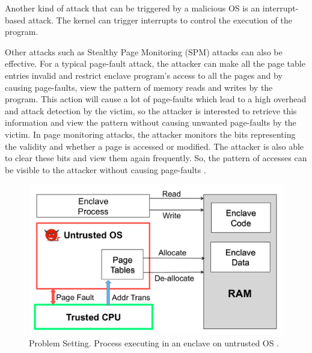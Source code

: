 Another kind of attack that can be triggered by a malicious OS is an interrupt-based attack. The kernel can trigger interrupts to control the execution of the program.

Other attacks such as Stealthy Page Monitoring (SPM) attacks \cite{stealthy,leakycauldron} can also be effective. For a typical page-fault attack, the attacker can make all the page table entries invalid and restrict enclave program’s access to all the pages and by causing page-faults, view the pattern of memory reads and writes by the program. This action will cause a lot of page-faults which lead to a high overhead and attack detection by the victim, so the attacker is interested to retrieve this information and view the pattern without causing unwanted page-faults by the victim. In page monitoring attacks, the attacker monitors the bits representing the validity and whether a page is accessed or modified. The attacker is also able to clear these bits and view them again frequently. So, the pattern of accesses can be visible to the attacker without causing page-faults \cite{stealthy,leakycauldron}.


\begin{figure}
	\includegraphics[scale=0.2]{images/uos1}
	\caption{Problem Setting. Process executing in an enclave on untrusted OS \cite{pigeonhole}.}
	\label{fig:uos}
\end{figure}

